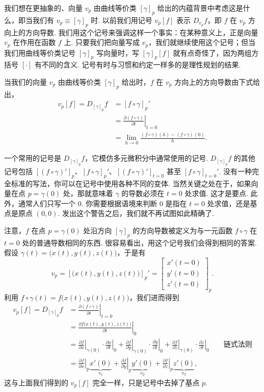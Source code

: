 我们想在更抽象的、向量 $v_p$ 由曲线等价类 $[\gamma]_p$ 给出的内蕴背景中考虑这是什么，即当我们有 $v_p\equiv[\gamma]_p$ 时. 以前我们用记号 $v_p[f]$ 表示 $D_{v_p}f$，即 $f$ 在 $v_p$ 方向上的方向导数. 我们用这个记号来强调这样一个事实：在某种意义上，正是向量 $v_p$ 在作用在函数 $f$ 上. 只要我们把向量写成 $v_p$，我们就继续使用这个记号；但当我们用曲线等价类记号 $[\gamma]_p$ 写向量时，写 $[\gamma]_p[f]$ 就有点奇怪了，因为两组方括号 $[\cdot]$ 有不同的含义. 记号有时与习惯和约定一样多的是理性规划的结果.

当我们的向量 $v_p$ 由曲线等价类 $[\gamma]_p$ 给出时，$f$ 在 $v_p$ 方向上的方向导数由下式给出，
\[
\begin{aligned}
v_p[f]=D_{[\gamma]_p}f&=[f\circ\gamma]_p'\\
&=\left.\frac{\partial(f\circ\gamma)}{\partial t}\right|_{t=0}\\
&=\lim_{h\to 0}\frac{(f\circ\gamma)(h)-(f\circ\gamma)(0)}{h}.
\end{aligned}
\]

一个常用的记号是 $D_{[\gamma]_p}f$，它模仿多元微积分中通常使用的记号. $D_{[\gamma]_p}f$ 的其他记号包括 $[(f\circ\gamma)']_p$、$[f\circ\gamma]_p'$、$[(f\circ\gamma)']_{t=0}$ 甚至 $[f\circ\gamma]_{t=0}'$. 没有一种完全标准的写法，你可以在记号中使用各种不同的变体. 当然关键之处在于，如果向量在点 $p=\gamma(0)$ 处，那就意味着 $\gamma$ 的导数必须在 $t=0$ 处求值. 这才是要点. 此外，通常人们只写一个 $0$. 你需要根据语境来判断 $0$ 是指在 $t=0$ 处求值，还是基点是原点 $(0,0)$. 发出这个警告之后，我们就不再试图如此精确了.

注意，$f$ 在点 $p=\gamma(0)$ 处沿方向 $[\gamma]_p$ 的方向导数被定义为与一元函数 $f\circ\gamma$ 在 $t=0$ 处的普通导数相同的东西. 很容易看出，用这个记号我们会得到相同的答案. 假设 $\gamma(t)=\bigl(x(t),y(t),z(t)\bigr)$，于是有
\[
v_p=\left[\bigl(x(t),y(t),z(t)\bigr)\right]_p'=\begin{bmatrix}x'(t=0)\\ y'(t=0)\\ z'(t=0)\end{bmatrix}_p.
\]
利用 $f\circ\gamma(t)=f\bigl(x(t),y(t),z(t)\bigr)$，我们进而得到
\[
\begin{aligned}
v_p[f]=D_{[\gamma]_p}f&=\left.\frac{\partial(f\circ\gamma)}{\partial t}\right|_{t=0}\\
&=\left.\frac{\partial f\bigl(x(t),y(t),z(t)\bigr)}{\partial t}\right|_0\\
&=\left.\frac{\partial f}{\partial x}\right|_{\gamma(0)}\cdot\left.\frac{\partial x}{\partial t}\right|_0+\left.\frac{\partial f}{\partial y}\right|_{\gamma(0)}\cdot\left.\frac{\partial y}{\partial t}\right|_0+\left.\frac{\partial f}{\partial z}\right|_{\gamma(0)}\cdot\left.\frac{\partial z}{\partial t}\right|_0\qquad\text{链式法则}\\
&=\left.\frac{\partial f}{\partial x}\right|_p\underbrace{x'(0)}_{v_1}+\left.\frac{\partial f}{\partial y}\right|_p\underbrace{y'(0)}_{v_2}+\left.\frac{\partial f}{\partial z}\right|_p\underbrace{z'(0)}_{v_3},
\end{aligned}
\]
这与上面我们得到的 $v_p[f]$ 完全一样，只是记号中去掉了基点 $p$.

